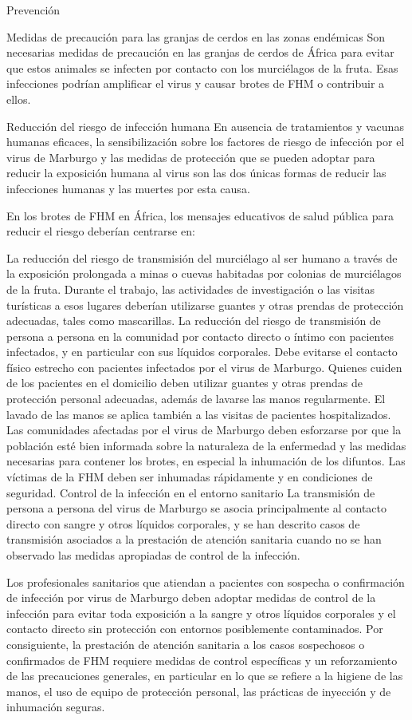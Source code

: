 Prevención

Medidas de precaución para las granjas de cerdos en las zonas endémicas
Son necesarias medidas de precaución en las granjas de cerdos de África para evitar que estos animales se infecten por contacto con los murciélagos de la fruta. Esas infecciones podrían amplificar el virus y causar brotes de FHM o contribuir a ellos.

Reducción del riesgo de infección humana
En ausencia de tratamientos y vacunas humanas eficaces, la sensibilización sobre los factores de riesgo de infección por el virus de Marburgo y las medidas de protección que se pueden adoptar para reducir la exposición humana al virus son las dos únicas formas de reducir las infecciones humanas y las muertes por esta causa.

En los brotes de FHM en África, los mensajes educativos de salud pública para reducir el riesgo deberían centrarse en:

La reducción del riesgo de transmisión del murciélago al ser humano a través de la exposición prolongada a minas o cuevas habitadas por colonias de murciélagos de la fruta. Durante el trabajo, las actividades de investigación o las visitas turísticas a esos lugares deberían utilizarse guantes y otras prendas de protección adecuadas, tales como mascarillas.
La reducción del riesgo de transmisión de persona a persona en la comunidad por contacto directo o íntimo con pacientes infectados, y en particular con sus líquidos corporales. Debe evitarse el contacto físico estrecho con pacientes infectados por el virus de Marburgo. Quienes cuiden de los pacientes en el domicilio deben utilizar guantes y otras prendas de protección personal adecuadas, además de lavarse las manos regularmente. El lavado de las manos se aplica también a las visitas de pacientes hospitalizados.
Las comunidades afectadas por el virus de Marburgo deben esforzarse por que la población esté bien informada sobre la naturaleza de la enfermedad y las medidas necesarias para contener los brotes, en especial la inhumación de los difuntos. Las víctimas de la FHM deben ser inhumadas rápidamente y en condiciones de seguridad.
Control de la infección en el entorno sanitario
La transmisión de persona a persona del virus de Marburgo se asocia principalmente al contacto directo con sangre y otros líquidos corporales, y se han descrito casos de transmisión asociados a la prestación de atención sanitaria cuando no se han observado las medidas apropiadas de control de la infección.

Los profesionales sanitarios que atiendan a pacientes con sospecha o confirmación de infección por virus de Marburgo deben adoptar medidas de control de la infección para evitar toda exposición a la sangre y otros líquidos corporales y el contacto directo sin protección con entornos posiblemente contaminados. Por consiguiente, la prestación de atención sanitaria a los casos sospechosos o confirmados de FHM requiere medidas de control específicas y un reforzamiento de las precauciones generales, en particular en lo que se refiere a la higiene de las manos, el uso de equipo de protección personal, las prácticas de inyección y de inhumación seguras.

